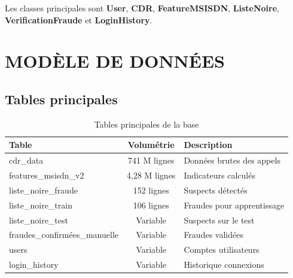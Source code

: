 \documentclass[12pt, oneside, a4paper]{report}
\begin{document}
Les classes principales sont \textbf{User}, \textbf{CDR}, \textbf{FeatureMSISDN}, \textbf{ListeNoire}, \textbf{VerificationFraude} et \textbf{LoginHistory}.

\section{MODÈLE DE DONNÉES}


\subsection{Tables principales}
\begin{table}[H]
\centering
\caption{Tables principales de la base}
\label{tab:tables}
\vspace{0.5cm}
\small
\renewcommand{\arraystretch}{1.3}
\begin{tabular}{|l|c|p{6cm}|}
\hline
\textbf{Table} & \textbf{Volumétrie} & \textbf{Description} \\
\hline
cdr\_data & 741 M lignes & Données brutes des appels \\
\hline
features\_msisdn\_v2 & 4,28 M lignes & Indicateurs calculés \\
\hline
liste\_noire\_fraude & 152 lignes & Suspects détectés \\
\hline
liste\_noire\_train & 106 lignes & Fraudes pour apprentissage \\
\hline
liste\_noire\_test & Variable & Suspects sur le test \\
\hline
fraudes\_confirmées\_manuelle & Variable & Fraudes validées \\
\hline
users & Variable & Comptes utilisateurs \\
\hline
login\_history & Variable & Historique connexions \\
\hline
\end{tabular}
\end{table}
\end{document}
